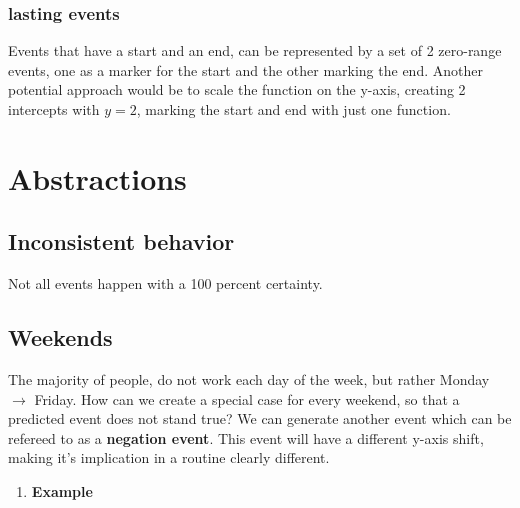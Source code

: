 \documentclass[11pt]{article}
\begin{document}
\subsubsection{lasting events}
\label{sec:orgde5247a}
Events that have a start and an end, can be represented by a set of 2 zero-range events, one as a marker for the start and the other marking the end. Another potential approach would be to scale the function on the y-axis, creating 2 intercepts with \(y=2\), marking the start and end with just one function.
\section{Abstractions}
\label{sec:org7b78960}
\subsection{Inconsistent behavior}
\label{sec:org0446827}
Not all events happen with a 100 percent certainty.
\subsection{Weekends}
\label{sec:org23273ea}
The majority of people, do not work each day of the week, but rather Monday \(\to\) Friday. How can we create a special case for every weekend, so that a predicted event does not stand true? We can generate another event which can be refereed to as a \textbf{negation event}. This event will have a different y-axis shift, making it's implication in a routine clearly different.
\begin{enumerate}
\item \textbf{Example}
\label{sec:org7073196}
\end{enumerate}
\end{document}
